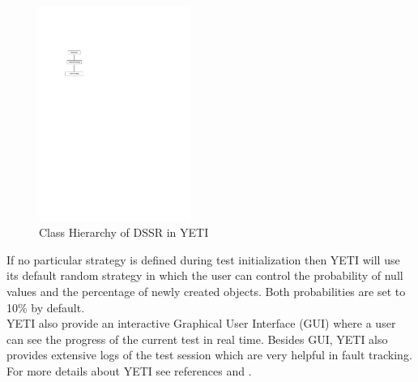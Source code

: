 \begin{figure}[htp]
\centering
\includegraphics[width=5cm,height=7cm]{figures/hierarchy.pdf}
\caption{Class Hierarchy of DSSR in YETI}
\label{fig:hierarchyofDSSR}
\end{figure}


If no particular strategy is defined during test initialization then YETI will use its default random strategy in which the user can control the probability of null values and the percentage of newly created objects. Both probabilities are set to 10\% by default. \\

YETI also provide an interactive Graphical User Interface (GUI) where a user can see the progress of the current test in real time. Besides GUI, YETI also provides extensive logs of the test session which are very helpful in fault tracking. For more details about YETI see references \cite{Oriol2010a} and \cite{Oriol2010}.